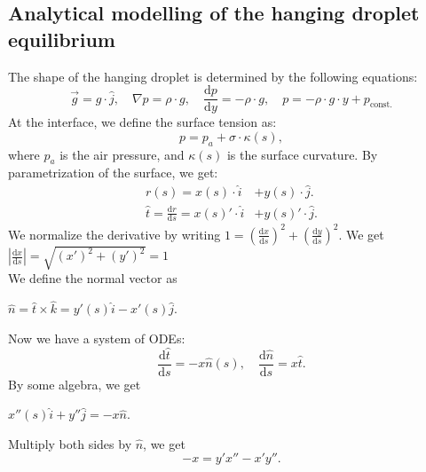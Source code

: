 \documentclass{jfm}
\begin{document}
\subsection{Analytical modelling of the hanging droplet equilibrium} \label{app:equi}
    The shape of the hanging droplet is determined by the following equations:\\
    \begin{equation}
        \vec{g}=g\cdot\hat{j}, \quad
        \nabla{p}=\rho\cdot{g}, \quad
        \frac{\mathrm{d}p}{\mathrm{d}y}=-\rho\cdot{g}, \quad
        p=-\rho\cdot{g}\cdot{y}+p_{\text{const.}}
    \end{equation}
    At the interface, we define the surface tension as:\\
    \begin{equation}
        p=p_{a}+\sigma \cdot \kappa(s),
        \label{eq:pressure}
    \end{equation}
    where $p_{a}$ is the air pressure, and $\kappa(s)$ is the surface curvature. By parametrization of the surface, we get:\\
    \begin{align}
        r(s)=x(s)\cdot\hat{i}&+y(s)\cdot\hat{j}.\\
        \hat{t}=\frac{\mathrm{d}r}{\mathrm{d}s}=x(s)'\cdot\hat{i}&+y(s)'\cdot\hat{j}.
    \end{align}
    We normalize the derivative by writing $1=\left(\frac{\mathrm{d}x}{\mathrm{d}s}\right)^2+\left(\frac{\mathrm{d}y}{\mathrm{d}s}\right)^2$. We get $\left|\frac{\mathrm{d}x}{\mathrm{d}s}\right|=\sqrt{(x')^2+(y')^2}=1$\\
    We define the normal vector as\\
    \begin{center}
        $\hat{n}=\hat{t}\times\hat{k}=y'(s)\hat{i}-x'(s)\hat{j}$.
    \end{center}
    Now we have a system of ODEs:\\
    \begin{equation}
        \frac{\mathrm{d}\hat{t}}{\mathrm{d}s}=-x\hat{n}(s), \quad
        \frac{\mathrm{d}\hat{n}}{\mathrm{d}s}=x\hat{t}.
    \end{equation}
    By some algebra, we get\\
    \begin{center}
        $x''(s)\hat{i}+y''\hat{j}=-x\hat{n}$.
    \end{center}
    Multiply both sides by $\hat{n}$, we get\\
    \begin{equation}
        -x=y'x''-x'y''. 
        \label{eq:curvature}
    \end{equation}
\end{document}
